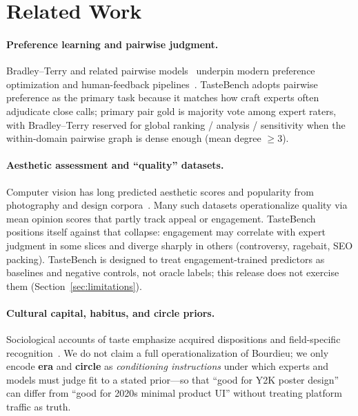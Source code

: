 \documentclass[11pt,a4paper]{article}
\begin{document}
\section{Related Work}
\label{sec:related}

\paragraph{Preference learning and pairwise judgment.}
Bradley--Terry and related pairwise models~\citep{bradley1952rank} underpin modern preference optimization and human-feedback pipelines~\citep{christiano2017deep,ouyang2022instructgpt,rafailov2023dpo}. TasteBench adopts pairwise preference as the primary task because it matches how craft experts often adjudicate close calls; primary pair gold is majority vote among expert raters, with Bradley--Terry reserved for global ranking / analysis / sensitivity when the within-domain pairwise graph is dense enough (mean degree $\ge 3$).

\paragraph{Aesthetic assessment and ``quality'' datasets.}
Computer vision has long predicted aesthetic scores and popularity from photography and design corpora~\citep{murray2012ava,kong2016aadb}. Many such datasets operationalize quality via mean opinion scores that partly track appeal or engagement. TasteBench positions itself against that collapse: engagement may correlate with expert judgment in some slices and diverge sharply in others (controversy, ragebait, SEO packing). TasteBench is designed to treat engagement-trained predictors as baselines and negative controls, not oracle labels; this release does not exercise them (Section~\ref{sec:limitations}).

\paragraph{Cultural capital, habitus, and circle priors.}
Sociological accounts of taste emphasize acquired dispositions and field-specific recognition~\citep{bourdieu1984distinction}. We do not claim a full operationalization of Bourdieu; we only encode \textbf{era} and \textbf{circle} as \emph{conditioning instructions} under which experts and models must judge fit to a stated prior---so that ``good for Y2K poster design'' can differ from ``good for 2020s minimal product UI'' without treating platform traffic as truth.
\end{document}
